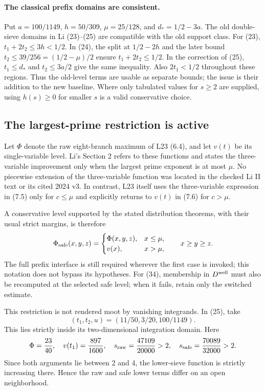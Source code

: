 \paragraph{The classical prefix domains are consistent.}
Put $a=100/1149$, $h=50/309$, $\mu=25/128$, and
$d_*=1/2-3a$. The old double-sieve domains in Li (23)--(25)
are compatible with the old support class. For (23),
$t_1+2t_2\le3h<1/2$. In (24), the split at $1/2-2h$
and the later bound $t_2\le39/256=(1/2-\mu)/2$ ensure
$t_1+2t_2\le1/2$. In the correction of (25),
$t_1\le d_*$ and $t_2\le3a/2$ give the same inequality.
Also $2t_1<1/2$ throughout these regions.
Thus the old-level terms are usable as separate bounds;
the issue is their addition to the new baseline.
Where only tabulated values for $s\ge2$ are supplied, using
$h(s)\ge0$ for smaller $s$ is a valid conservative choice.

\subsection{The largest-prime restriction is active}
\label{sec:external-largest-prime-resolution}

Let $\Phi$ denote the raw eight-branch maximum of L23 (6.4),
and let $v(t)$ be its single-variable level. Li's Section 2
refers to these functions and states the three-variable
improvement only when the largest prime exponent is at most
$\mu$. No piecewise extension of the three-variable function
was located in the checked Li II text or its cited 2024 v3.
In contrast, L23 itself uses the three-variable expression in
(7.5) only for $c\le\mu$ and explicitly returns to $v(t)$
in (7.6) for $c>\mu$.

A conservative level supported by the stated distribution
theorems, with their usual strict margins, is therefore
\[
 \Phi_{\rm safe}(x,y,z)=
 \begin{cases}
  \Phi(x,y,z),&x\le\mu,\\
  v(x),&x>\mu,
 \end{cases}
 \qquad x\ge y\ge z.
\]
The full prefix interface is still required wherever the first
case is invoked; this notation does not bypass its hypotheses.
For (34), membership in $D^{\rm well}$ must also be recomputed
at the selected safe level; when it fails, retain only the
switched estimate.

This restriction is not rendered moot by vanishing integrands.
In (25), take
\[
 (t_1,t_2,u)=(11/50,3/20,100/1149).
\]
This lies strictly inside its two-dimensional integration
domain. Here
\[
 \Phi=\frac{23}{40},\quad v(t_1)=\frac{897}{1600},\quad
 s_{\rm raw}=\frac{47109}{20000}>2,\quad
 s_{\rm safe}=\frac{70089}{32000}>2.
\]
Since both arguments lie between 2 and 4, the lower-sieve
function is strictly increasing there. Hence the raw and safe
lower terms differ on an open neighborhood.

